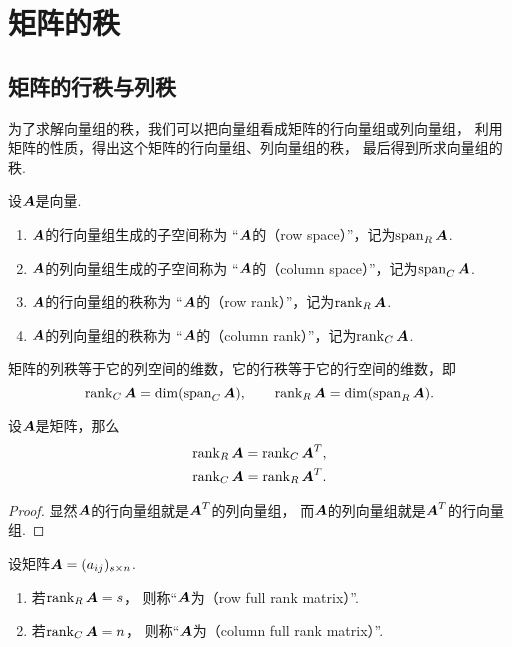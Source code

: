 \section{矩阵的秩}
\subsection{矩阵的行秩与列秩}
为了求解向量组的秩，我们可以把向量组看成矩阵的行向量组或列向量组，
利用矩阵的性质，得出这个矩阵的行向量组、列向量组的秩，
最后得到所求向量组的秩.

\begin{definition}\label{definition:线性方程组.行秩与列秩的定义}
设\(\boldsymbol{A}\)是向量.
\begin{enumerate}
	\item \(\boldsymbol{A}\)的行向量组生成的子空间称为
	“\(\boldsymbol{A}\)的（row space）”，记为\(\operatorname{span}_R\boldsymbol{A}\).
	\item \(\boldsymbol{A}\)的列向量组生成的子空间称为
	“\(\boldsymbol{A}\)的（column space）”，记为\(\operatorname{span}_C\boldsymbol{A}\).
	\item \(\boldsymbol{A}\)的行向量组的秩称为
	“\(\boldsymbol{A}\)的（row rank）”，记为\(\rank_R\boldsymbol{A}\).
	\item \(\boldsymbol{A}\)的列向量组的秩称为
	“\(\boldsymbol{A}\)的（column rank）”，记为\(\rank_C\boldsymbol{A}\).
\end{enumerate}
\end{definition}

矩阵的列秩等于它的列空间的维数，它的行秩等于它的行空间的维数，即\[
	\rank_C\boldsymbol{A}=\dim(\operatorname{span}_C\boldsymbol{A}), \qquad
	\rank_R\boldsymbol{A}=\dim(\operatorname{span}_R\boldsymbol{A}).
\]

\begin{theorem}
设\(\boldsymbol{A}\)是矩阵，那么\begin{gather}
	\rank_R\boldsymbol{A}=\rank_C\boldsymbol{A}^T, \\
	\rank_C\boldsymbol{A}=\rank_R\boldsymbol{A}^T.
\end{gather}
\begin{proof}
显然\(\boldsymbol{A}\)的行向量组就是\(\boldsymbol{A}^T\)的列向量组，
而\(\boldsymbol{A}\)的列向量组就是\(\boldsymbol{A}^T\)的行向量组.
\end{proof}
\end{theorem}

\begin{definition}
设矩阵\(\boldsymbol{A} = (a_{ij})_{s \times n}\).
\begin{enumerate}
	\item 若\(\rank_R\boldsymbol{A} = s\)，
	则称“\(\boldsymbol{A}\)为（row full rank matrix）”.
	\item 若\(\rank_C\boldsymbol{A} = n\)，
	则称“\(\boldsymbol{A}\)为（column full rank matrix）”.
\end{enumerate}
\end{definition}

